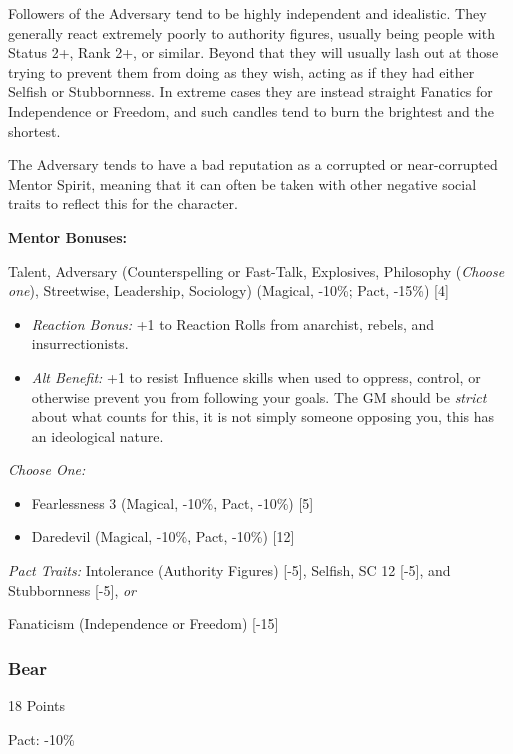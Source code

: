 \begin{multicols}{3}
	Followers of the Adversary tend to be highly independent and idealistic. They generally react extremely poorly to authority figures, usually being people with Status 2+, Rank 2+, or similar. Beyond that they will usually lash out at those trying to prevent them from doing as they wish, acting as if they had either Selfish or Stubbornness. In extreme cases they are instead straight Fanatics for Independence or Freedom, and such candles tend to burn the brightest and the shortest.
	
	The Adversary tends to have a bad reputation as a corrupted or near-corrupted Mentor Spirit, meaning that it can often be taken with other negative social traits to reflect this for the character.
	
	\textbf{Mentor Bonuses:} 
	
	Talent, Adversary (Counterspelling or Fast-Talk, Explosives, Philosophy (\textit{Choose one}), Streetwise, Leadership, Sociology) (Magical, -10\%; Pact, -15\%) [4] %
	\begin{itemize}
		\itemsep 0pt
		\item \textit{Reaction Bonus:} +1 to Reaction Rolls from anarchist, rebels, and insurrectionists.
		\item \textit{Alt Benefit:} +1 to resist Influence skills when used to oppress, control, or otherwise prevent you from following your goals. The GM should be \textit{strict} about what counts for this, it is not simply someone opposing you, this has an ideological nature.
	\end{itemize}
		
	\textit{Choose One:}
	\begin{itemize}
		\itemsep 0pt
		\item Fearlessness 3 (Magical, -10\%, Pact, -10\%) [5]
		\item Daredevil (Magical, -10\%, Pact, -10\%) [12]
	\end{itemize}
	
	\textit{Pact Traits:} Intolerance (Authority Figures) [-5], Selfish, SC 12 [-5], and Stubbornness [-5], \textit{or}
	
	Fanaticism (Independence or Freedom) [-15]
	
	\subsubsection{Bear}
	\begin{flushright}
		18 Points
	\end{flushright}
	Pact: -10\%
	

\end{multicols}
